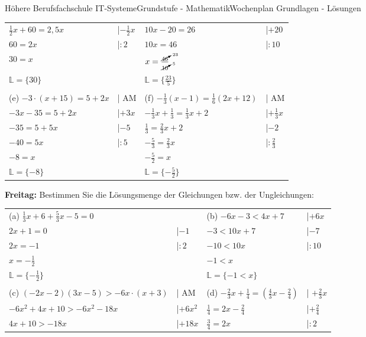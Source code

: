 \documentclass[oneside,openany,headings=optiontotoc,11pt,numbers=noenddot]{scrreprt}
\begin{document}
\begin{worksheet}{Höhere Berufsfachschule IT-Systeme}{Grundstufe - Mathematik}{Wochenplan Grundlagen - Lösungen}
\begin{framed}
\begin{tabularx}{\textwidth}{Xl|Xl}
				\(\frac{1}{2}x +60 = 2,5x\) & |\(-\frac{1}{2}x\) & \(10x -20 = 26\) & |\(+20\)\\
				\(60 = 2x\) & |\(:2\) & \(10x = 46\) & |\(:10\)\\
				\(30 = x\) & & \(x = \frac{\cancelto{23}{46}}{\cancelto{5}{10}}\) & \\
				\(\mathbb{L} = \{30\}\) & & \(\mathbb{L} = \{\frac{23}{5}\}\)\\
				\hline
				\hline
				\\
				(e) \(-3\cdot(x+15) = 5 +2x\) & | AM & (f) \(-\frac{1}{3}(x-1) = \frac{1}{6}(2x+12)\) & | AM\\
				\(-3x -35 = 5 +2x\) & |\(+3x\) & \(-\frac{1}{3}x + \frac{1}{3} = \frac{1}{3}x + 2\) & |\(+\frac{1}{3}x\)\\
				\(-35 = 5 + 5x\) & |\(-5\) & \(\frac{1}{3} = \frac{2}{3}x + 2\) & |\(-2\)\\
				\(-40 = 5x\) & |\(:5\) & \( -\frac{5}{3} = \frac{2}{3}x\) &|\(:\frac{2}{3}\)\\
				\(-8 = x\) & & \(-\frac{5}{2} = x\)\\
				\(\mathbb{L} = \{-8\}\) & & \(\mathbb{L} = \{-\frac{5}{2}\}\)
			\end{tabularx}
		\end{framed}
		\newpage
		\begin{framed}
			\noindent
			\textbf{Freitag:} Bestimmen Sie die Lösungsmenge der Gleichungen bzw. der Ungleichungen:\\
			\begin{tabularx}{\textwidth}{XlXl}
				(a) \(\frac{1}{3}x + 6 + \frac{5}{3}x -5 = 0\) & & (b) \(-6x-3 < 4x+7\) & |\(+6x\)\\
				\(2x +1 = 0\) & |\(-1\) & \(-3 < 10x +7\) & |\(-7\)\\
				\(2x = -1\) & |\(:2\) & \(-10 < 10x\) & |\(:10\)\\
				\( x = -\frac{1}{2}\) & & \(-1 < x\) & \\
				\(\mathbb{L} = \{-\frac{1}{2}\}\) & & \(\mathbb{L} = \{-1 < x\}\)\\
				\hline
				\hline
				\\
				(c) \((-2x-2)(3x-5) > -6x\cdot(x+3)\) & | AM & (d) \(-\frac{2}{3}x + \frac{1}{4} = (\frac{4}{3}x - \frac{2}{4})\) & | \(+\frac{2}{3}x\)\\
				\(-6x^2 + 4x +10 > -6x^2 - 18x\) & |\(+6x^2\) & \(\frac{1}{4} = 2x -\frac{2}{4}\) & |\(+\frac{2}{4}\)\\
				\(4x +10 > -18x\) & |\(+18x\) & \(\frac{3}{4} = 2x\) & |\(:2\)\\

\end{tabularx}
\end{framed}
\end{worksheet}
\end{document}
